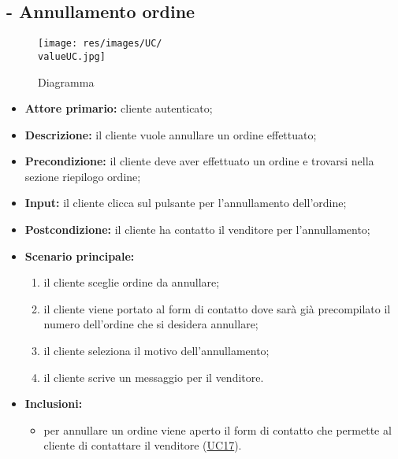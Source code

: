 \subsection{ - Annullamento ordine}
\begin{figure}[H]
    \centering
    \texttt{[image: res/images/UC/\\valueUC.jpg]}
    \caption{Diagramma }
\end{figure}
\begin{itemize}
    \item \textbf{Attore primario:} cliente autenticato;
    \item \textbf{Descrizione:} il cliente vuole annullare un ordine effettuato;
    \item \textbf{Precondizione:} il cliente deve aver effettuato un ordine e trovarsi nella sezione riepilogo ordine;
    \item \textbf{Input:} il cliente clicca sul pulsante per l'annullamento dell'ordine;
    \item \textbf{Postcondizione:} il cliente ha contatto il venditore per l'annullamento;
    \item \textbf{Scenario principale:}
          \begin{enumerate}
              \item il cliente sceglie ordine da annullare;
              \item il cliente viene portato al form di contatto dove sarà già precompilato il numero dell'ordine che si desidera annullare;
              \item il cliente seleziona il motivo dell'annullamento;
              \item il cliente scrive un messaggio per il venditore.
          \end{enumerate}
    \item \textbf{Inclusioni:}
          \begin{itemize}
              \item per annullare un ordine viene aperto il form di contatto che permette al cliente di contattare il venditore (\hyperref[UC17]{UC17}).
          \end{itemize}
\end{itemize}

\stepUserCase

